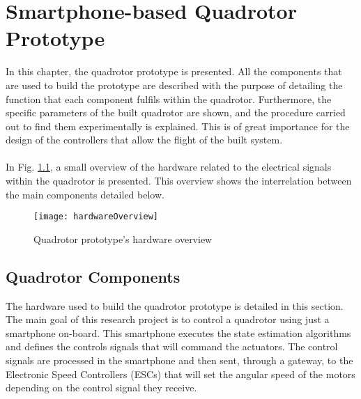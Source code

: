 \chapter{Smartphone-based Quadrotor Prototype} \label{ch:prototype}
In this chapter, the quadrotor prototype is presented. All the components that are used to build the prototype are described with the purpose of detailing the function that each component fulfils within the quadrotor. Furthermore, the specific parameters of the built quadrotor are shown, and the procedure carried out to find them experimentally is explained. This is of great importance for the design of the controllers that allow the flight of the built system.
\\\\
In Fig. \ref{fig:hardwareoverview}, a small overview of the hardware related to the electrical signals within the quadrotor is presented. This overview shows the interrelation between the main components detailed below.
\begin{figure}[h]
	\begin{center}
		\texttt{[image: hardwareOverview]}    
		\caption{Quadrotor prototype's hardware overview} 
		\label{fig:hardwareoverview}
	\end{center}
\end{figure}

\section{Quadrotor Components}
\label{sec:components}
The hardware used to build the quadrotor prototype is detailed in this section. The main goal of this research project is to control a quadrotor using just a smartphone on-board. This smartphone executes the state estimation algorithms and defines the controls signals that will command the actuators. The control signals are processed in the smartphone and then sent, through a gateway, to the Electronic Speed Controllers (ESCs) that will set the angular speed of the motors depending on the control signal they receive.
